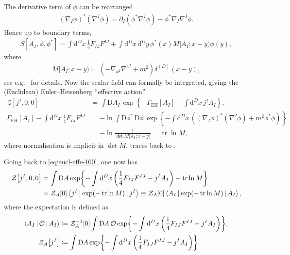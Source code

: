 \documentclass[12pt]{article}
\newcommand\dif{\mathrm{d}}
\newcommand\Dif{\mathrm{D}}
\DeclareMathOperator{\tr}{tr}
\newcommand{\rbr}[1]{{\left(#1\right)}}
\newcommand{\rfun}[2]{{#1}\mathopen{}\left(#2\right)\mathclose{}}
\newcommand{\sfun}[2]{{#1}\mathopen{}\left[#2\right]\mathclose{}}
\newcommand{\cfun}[2]{{#1}\mathopen{}\left\{#2\right\}\mathclose{}}
\begin{document}
The derivative term of $\phi$ can be rearranged
\begin{align}
\rbr{\nabla_{\! I} \phi}^* \rbr{\nabla^{I} \phi} = \partial_I\rbr{\phi^* 
\nabla^{I}\phi} - \phi^* \nabla_{\! I} \nabla^{I} \phi.
\end{align}
Hence up to boundary terms,
\begin{align}
\sfun{S}{A_I, \phi, \phi^*} = \int \dif^D x\, \frac{1}{4} F_{IJ} F^{IJ} +
	\int \dif^D x\,\dif^D y\,
	\rfun{\phi^*}{x} M[A_I; x-y) \rfun{\phi}{y},
\end{align}
where
\begin{align}
M[A_I; x-y) \coloneqq \rbr{-\nabla_{\! x^I} \nabla^{x^I} + m^2} 
\rfun{\delta^{(D)}}{x-y},
\end{align}
see e.g.\ \cite[ch.\ 6]{mosel2004} for details. Now the scalar field can 
formally be integrated, giving the (Euclidean) Euler--Heisenberg ``effective 
action''
\begin{align}
\sfun{\mathcal{Z}}{j^I, 0, 0} &\eqqcolon
\int \Dif A_I\,\cfun{\exp}{-\sfun{\varGamma_\text{EH}}{A_I}
+ \int \dif^D x\,j^I A_I},
\\
\sfun{\varGamma_\text{EH}}{A_I} - \int\dif^{D} x\,
\frac{1}{4} F_{IJ} F^{IJ}
&=
-\ln \int \Dif\phi^*\,\Dif\phi\,
	\cfun{\exp}{-\int\dif^{D} x\, \rbr{
	\rbr{\nabla_{\! I} \phi}^* \rbr{\nabla^{I} \phi} + m^2 \phi^* \phi}}
\nonumber \\
&= -\ln \frac{1}{\det M[A_I; x-y)} = \tr \ln M,
\label{eq:eucl-effe-150}
\end{align}
where normalisation is implicit in $\det M$.  traces 
back to \cite{heisenberg1936,weisskopf1936}.

Going back to \cref{eq:eucl-effe-100}, one now has
\begin{align}
\sfun{\mathcal{Z}}{j^I, 0, 0} &=
\int\Dif A\, \cfun{\exp}{-\int \dif^D x\,
\rbr{\frac{1}{4} F_{IJ} F^{IJ} - j^{I} A_{I}} - \tr\ln M}
\nonumber \\
&=
\sfun{\mathcal{Z}_{A}}{0}
	\Braket{j^I | \rfun{\exp}{-\tr\ln M} | j^I}
\equiv \sfun{\mathcal{Z}_{A}}{0}
	\Braket{A_I | \rfun{\exp}{-\tr\ln M} | A_I},
\label{eq:eucl-effe-200}
\end{align}
where the expectation is defined as
\begin{align}
\Braket{A_I | \mathcal{O} | A_I} &\coloneqq
	\sfun{\mathcal{Z}_{A}^{-1}}{0}
	\int\Dif A\, \mathcal{O}\,\cfun{\exp}{-\int \dif^D x\,
		\rbr{\frac{1}{4} F_{IJ} F^{IJ} - j^{I} A_{I}}},
\\
\sfun{\mathcal{Z}_{A}}{j^I} &\coloneqq
\int\Dif A\, \cfun{\exp}{-\int \dif^D x\,
\rbr{\frac{1}{4} F_{IJ} F^{IJ} - j^{I} A_{I}}}.
\end{align}
\end{document}

